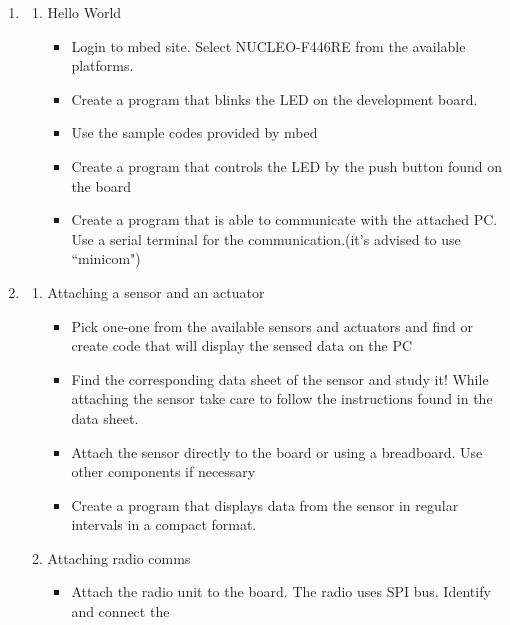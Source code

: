 \documentclass[a4paper]{article}
\begin{document}
\begin{enumerate}
    \item \begin{enumerate}
              \item Hello World
                    \begin{itemize}
                        \item Login to mbed site. Select NUCLEO-F446RE from the available platforms.
                        \item Create a program that blinks the LED on the development board.
                        \item Use the sample codes provided by mbed
                        \item Create a program that controls the LED by the push button found on the board
                        \item Create a program that is able to communicate with the attached PC. Use a serial
                              terminal for the communication.(it's advised to use ``minicom")
                    \end{itemize}
          \end{enumerate}
    \item \begin{enumerate}
              \item Attaching a sensor and an actuator
                    \begin{itemize}
                        \item Pick one-one from the available sensors and actuators and find or create code
                              that will display the sensed data on the PC
                        \item Find the corresponding data sheet of the sensor and study it! While attaching
                              the sensor take care to follow the instructions found in the data sheet.
                        \item Attach the sensor directly to the board or using a breadboard. Use other components
                              if necessary
                        \item Create a program that displays data from the sensor in regular intervals in a compact format.
                    \end{itemize}
              \item Attaching radio comms
                    \begin{itemize}
                        \item Attach the radio unit to the board. The radio uses SPI bus. Identify and connect the

\end{itemize}
\end{enumerate}
\end{enumerate}
\end{document}
